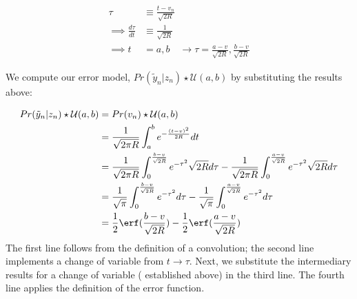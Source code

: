 \begin{align}
\tau & \equiv \frac{t-v_n}{\sqrt{2R}} \\
\implies \frac{d\tau}{dt} & \equiv \frac{1}{\sqrt{2R}} \\
\implies t& = a, b \quad \to \tau = \frac{a-v}{\sqrt{2R}}, \frac{b-v}{\sqrt{2R}} 
\end{align}

We compute our error model, $Pr( \tilde{y}_n | z_n) \star \mathcal{U}(a,b)$ by substituting the results above:

\begin{align}
Pr( \tilde{y}_n | z_n) \star \mathcal{U}(a,b) & =  Pr( v_n) \star \mathcal{U}(a,b) \\
& = \frac{1}{\sqrt{2\pi R}} \int_{a}^{b} e^{-\frac{(t-v)^2}{2R}} dt\\
& = \frac{1}{\sqrt{2\pi R}} \int_{0}^{\frac{b-v}{\sqrt{2R}} } e^{-\tau^2} \sqrt{2 R} d\tau  - \frac{1}{\sqrt{2\pi R}} \int_{0}^{\frac{a-v}{\sqrt{2R}}} e^{-\tau^2} \sqrt{2 R} d\tau \\
& = \frac{1}{\sqrt{\pi }} \int_{0}^{\frac{b-v}{\sqrt{2R}} } e^{-\tau^2} d\tau  - \frac{1}{\sqrt{\pi }} \int_{0}^{\frac{a-v}{\sqrt{2R}}} e^{-\tau^2} d\tau \\
& = \frac{1}{2} \erf(\frac{b-v}{\sqrt{2R}}) - \frac{1}{2} \erf(\frac{a-v}{\sqrt{2R}})
\end{align}
The first line follows from the definition of a convolution; the second line implements a change of variable from $ t \to \tau$. Next, we substitute the intermediary results for a change of variable ( established above) in the third line. The fourth line applies the definition of the error function.


